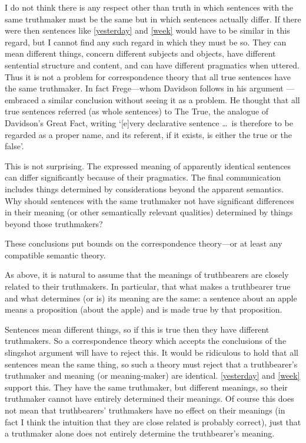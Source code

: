 I do not think there is any respect other than truth in which sentences with the same truthmaker must be the same but in which sentences actually differ. 
If there were then sentences like \ref{yesterday} and \ref{week} would have to be similar in this regard, but I cannot find any such regard in which they must be so.
They can mean different things, concern different subjects and objects, have different sentential structure and content, and can have different pragmatics when uttered.
Thus it is not a problem for correspondence theory that all true sentences have the same truthmaker.
In fact Frege---whom Davidson follows in his argument \parencite[750]{Davidson_1969}---embraced a similar conclusion without seeing it as a problem.
He thought that all true sentences referred (as whole sentences) to The True, the analogue of Davidson's Great Fact, writing `[e]very declarative sentence \ldots\ is therefore to be regarded as a proper name, and its referent, if it exists, is either the true or the false'.\footnotemark
\parencite[216]{Frege_1948}

This is not surprising.
The expressed meaning of apparently identical sentences can differ significantly because of their pragmatics.
The final communication includes things determined by considerations beyond the apparent semantics.
Why should sentences with the same truthmaker not have significant differences in their meaning (or other semantically relevant qualities) determined by things beyond those truthmakers?

These conclusions put bounds on the correspondence theory---or at least any compatible semantic theory.

As above, it is natural to assume that the meanings of truthbearers are closely related to their truthmakers.
In particular, that what makes a truthbearer true and what determines (or is) its meaning are the same: a sentence about an apple means a proposition (about the apple) and is made true by that proposition.

Sentences mean different things, so if this is true then they have different truthmakers.
So a correspondence theory which accepts the conclusions of the slingshot argument will have to reject this.
It would be ridiculous to hold that all sentences mean the same thing, so such a theory must reject that a truthbearer's truthmaker and meaning (or meaning-maker) are identical.
\ref{yesterday} and \ref{week} support this.
They have the same truthmaker, but different meanings, so their truthmaker cannot have entirely determined their meanings.
Of course this does not mean that truthbearers' truthmakers have no effect on their meanings (in fact I think the intuition that they are close related is probably correct), just that a truthmaker alone does not entirely determine the truthbearer's meaning.

